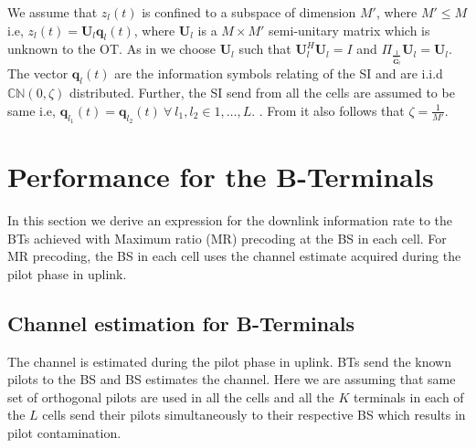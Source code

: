 \documentclass[10pt, a4paper, twoside,fleqn]{article}
\begin{document}
We assume that $z_l(t)$ is confined to a subspace of dimension $M'$, where $M'\leq M$ i.e, $z_l(t) = \pmb{U}_l\pmb{q}_l(t)$, where $\pmb{U}_l$ is a $M\times M'$ semi-unitary matrix which is unknown to the OT. As in \cite{bib:jbb} we choose $\pmb{U}_l$ such that $\pmb{U}_l^H\pmb{U}_l=I$ and $\Pi_{\frac{1}{\pmb{\hat G}_l}}\pmb{U}_l=\pmb{U}_l$. The vector $\pmb{q}_l(t)$ are the information symbols relating of the SI and are i.i.d ${\mathbb C}{\mathbb N}(0,\zeta)$ distributed. Further, the SI send from all the cells are assumed to be same i.e, $\pmb{q}_{l_1}(t) = \pmb{q}_{l_2}(t) \ \forall \ l_1,l_2 \in {1 ,\dotsc, L}$. . From \cite{bib:jbb} it also follows that $\zeta=\frac{1}{M'}$. 
\section{Performance for the B-Terminals}
In this section we derive an  expression for the downlink information rate to the BTs achieved with Maximum ratio (MR) precoding at the BS in each cell. For MR precoding, the BS in each cell uses the channel estimate acquired during the pilot phase in uplink.  

\subsection{Channel estimation for B-Terminals} \label{sec:btchesti}
	The channel is estimated during the pilot phase in uplink. BTs send the known pilots to the BS and BS estimates the channel. Here we are assuming that same set of orthogonal pilots are used in all the cells and all the $K$ terminals in each of the $L$ cells send their pilots simultaneously to their respective BS which results in pilot contamination.
\end{document}
